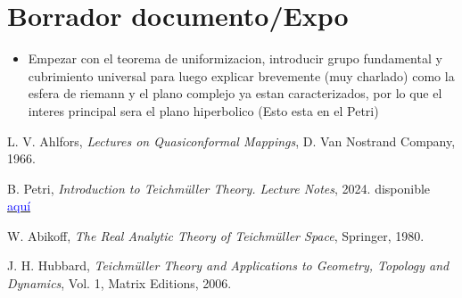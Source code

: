 \documentclass[12pt]{article}
\begin{document}
    \section{Borrador documento/Expo} 
    \begin{itemize}
        \item Empezar con el teorema de uniformizacion, introducir grupo fundamental y cubrimiento universal para luego  explicar brevemente (muy charlado) como la esfera de riemann y el plano complejo ya estan caracterizados, por lo que el interes principal sera el plano hiperbolico (Esto esta en el Petri) 
    \end{itemize}

\begin{thebibliography}{9}

L. V. Ahlfors, \textit{Lectures on Quasiconformal Mappings}, D. Van Nostrand Company, 1966.

B. Petri, \textit{Introduction to Teichmüller Theory. Lecture Notes}, 2024. disponible \href{https://webusers.imj-prg.fr/~bram.petri/teaching_tt_2425.html}{\textcolor{blue}{aquí}}

W. Abikoff, \textit{The Real Analytic Theory of Teichmüller Space}, Springer, 1980.



J. H. Hubbard, \textit{Teichmüller Theory and Applications to Geometry, Topology and Dynamics}, Vol. 1, Matrix Editions, 2006.


\end{thebibliography}
\end{document}
